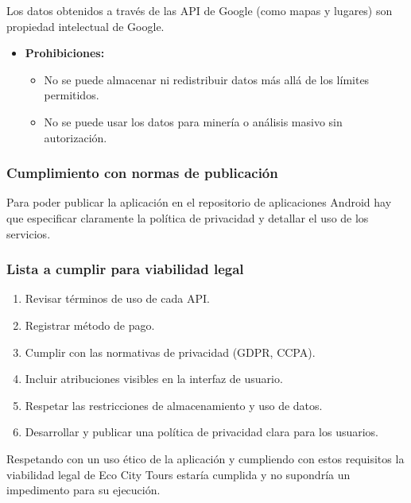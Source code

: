 Los datos obtenidos a través de las API de Google (como mapas y lugares) son propiedad intelectual de Google.


\begin{itemize}
	\item \textbf{Prohibiciones:}
	\begin{itemize}
		\item No se puede almacenar ni redistribuir datos más allá de los límites permitidos.
		\item No se puede usar los datos para minería o análisis masivo sin autorización.
	\end{itemize}
\end{itemize}

\subsubsection{Cumplimiento con normas de publicación}

Para poder publicar la aplicación en el repositorio de aplicaciones Android hay que especificar claramente la política de privacidad y detallar el uso de los servicios.


\subsubsection{Lista a cumplir para viabilidad legal}

\begin{enumerate}
	\item Revisar términos de uso de cada API.
	\item Registrar método de pago.
	\item Cumplir con las normativas de privacidad (GDPR, CCPA).
	\item Incluir atribuciones visibles en la interfaz de usuario.
	\item Respetar las restricciones de almacenamiento y uso de datos.
	\item Desarrollar y publicar una política de privacidad clara para los usuarios.
\end{enumerate}

Respetando con un uso ético de la aplicación y cumpliendo con estos requisitos la viabilidad legal de Eco City Tours estaría cumplida y no supondría un impedimento para su ejecución.